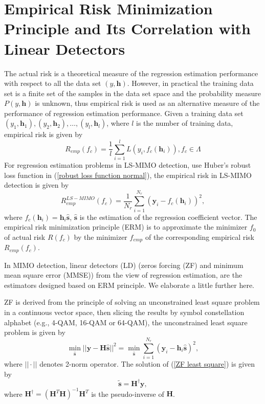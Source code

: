 \documentclass[10pt, draftclsnofoot, onecolumn]{IEEEtran}
\begin{document}
\section{Empirical Risk Minimization Principle and Its Correlation with Linear Detectors}
The actual risk is a theoretical measure of the regression estimation performance with respect to all the data set $(y,\mathbf{h})$. However, in practical the training data set is a finite set of the samples in the data set space and the probability measure $P(y,\mathbf{h})$ is unknown, thus empirical risk is used as an alternative measure of the performance of regression estimation performance. Given a training data set $(y_{1}, \mathbf{h}_{1}), (y_{2}, \mathbf{h}_{2}), \ldots, (y_{l}, \mathbf{h}_{l})$, where $l$ is the number of training data, empirical risk is given by 
\begin{equation}
R_{emp}(f_{c})=\frac{1}{l}\sum_{i=1}^{l}L(y_{i}, f_{c}(\mathbf{h}_{i})), f_{c}\in \Lambda
\label{empirical risk}
\end{equation}
For regression estimation problems in LS-MIMO detection, use Huber's robust loss function in (\ref{robust loss function normal}), the empirical risk in LS-MIMO detection is given by 
\begin{equation}
R^{LS-MIMO}_{emp}(f_{c})=\frac{1}{N_{r}}\sum_{i=1}^{N_{r}}(\mathbf{y}_{i}-f_{c}(\mathbf{h}_{i}))^{2},
\label{empirical risk MIMO}
\end{equation}
where $f_{c}(\mathbf{h}_{i})=\mathbf{h}_{i}\hat{\mathbf{s}}$, $\hat{\mathbf{s}}$ is the estimation of the regression coefficient vector. The empirical risk minimization principle (ERM) is to approximate the minimizer $f_{0}$ of actual risk $R(f_{c})$ by the minimizer $f_{emp}$ of the corresponding empirical risk $R_{emp}(f_{c})$. 

In MIMO detection, linear detectors (LD) (zeros forcing (ZF) and minimum mean square error (MMSE)) from the view of regression estimation, are the estimators designed based on ERM principle. We elaborate a little further here. 

ZF is derived from the principle of solving an unconstrained least square problem in a continuous vector space\cite{kailath2005mimo}, then slicing the results by symbol constellation alphabet (e.g., 4-QAM, 16-QAM or 64-QAM), the unconstrained least square problem is given by 
\begin{equation}
\min_{\hat{\mathbf{s}}}||\mathbf{y}-\mathbf{H}\hat{\mathbf{s}}||^{2}=\min_{\hat{\mathbf{s}}}\sum_{i=1}^{N_{r}}(\mathbf{y}_{i}-\mathbf{h}_{i}\hat{\mathbf{s}})^{2},
\label{ZF least square}
\end{equation}
where $||\cdot||$ denotes 2-norm operator. The solution of (\ref{ZF least square}) is given by 
\begin{equation}
\tilde{\mathbf{s}}=\mathbf{H}^{\dagger}\mathbf{y},
\label{ZF solution}
\end{equation}
where $\mathbf{H}^{\dagger}=(\mathbf{H}^{T}\mathbf{H})^{-1}\mathbf{H}^{T}$ is the pseudo-inverse of $\mathbf{H}$.
\end{document}
